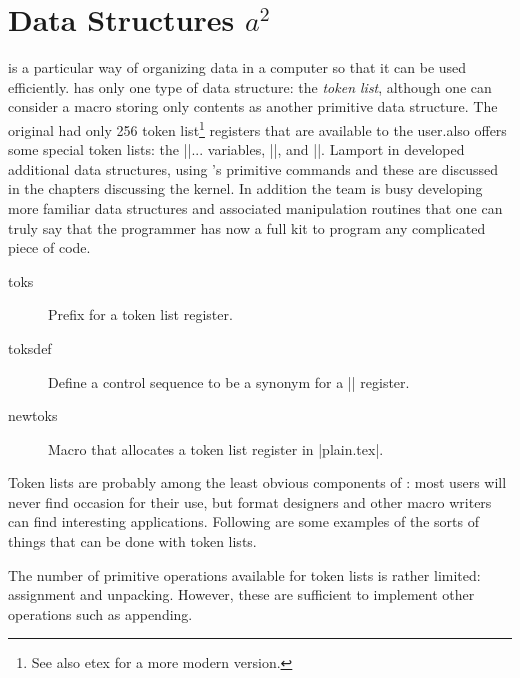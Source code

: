           
\chapter[Data Structures]{Data Structures $a^2$}

 is a particular way of organizing data in a computer so that it can be
used efficiently. \tex has only one type of data structure: the \emph{token list}, although one can consider a macro storing only contents as another primitive data structure. The original \tex had only 256 token list\footnote{See also etex for a more modern version.} registers that are
available to the user.\tex also offers some special token lists: the |\every|... variables, |\errhelp|,
and |\output|. Lamport in \latex developed additional data structures, using \tex’s primitive commands and  these are discussed in the chapters discussing the \latex kernel. In addition the  team is busy developing more familiar data structures and associated manipulation routines that one can truly say that the \tex programmer has now a full kit to program any complicated piece of code.



\begin{description}
\item [toks] Prefix for a token list register.
\item [toksdef]  Define a control sequence to be a synonym for a |\toks| register.
\item [newtoks] Macro that allocates a token list register in |plain.tex|.
\end{description}


Token lists are probably among the least obvious components of \tex: most \tex users will never
find occasion for their use, but format designers and other macro writers can find interesting
applications. Following are some examples of the sorts of things that can be done with token lists.

The number of primitive operations available for token lists is rather limited: assignment and
unpacking. However, these are sufficient to implement other operations such as appending.

